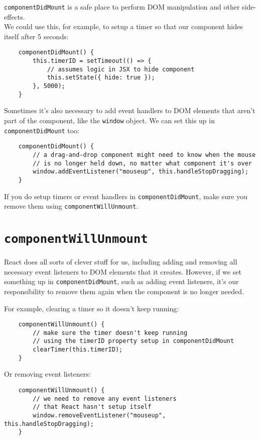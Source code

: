 \texttt{componentDidMount} is a safe place to perform DOM manipulation and other side-effects.
\\

We could use this, for example, to setup a timer so that our component hides itself after 5 seconds:

\begin{verbatim}
    componentDidMount() {
        this.timerID = setTimeout(() => {
            // assumes logic in JSX to hide component
            this.setState({ hide: true });
        }, 5000);
    }
\end{verbatim}

Sometimes it's also necessary to add event handlers to DOM elements that aren't part of the component, like the \texttt{window} object. We can set this up in \texttt{componentDidMount} too:

\begin{verbatim}
    componentDidMount() {
        // a drag-and-drop component might need to know when the mouse
        // is no longer held down, no matter what component it's over
        window.addEventListener("mouseup", this.handleStopDragging);
    }
\end{verbatim}

If you do setup timers or event handlers in \texttt{componentDidMount}, make sure you remove them using \texttt{componentWillUnmount}.


\section{\texttt{componentWillUnmount}}

React does all sorts of clever stuff for us, including adding and removing all necessary event listeners to DOM elements that it creates. However, if we set something up in \texttt{componentDidMount}, such as adding event listeners, it's our responsibility to remove them again when the component is no longer needed.

For example, clearing a timer so it doesn't keep running:

\begin{verbatim}
    componentWillUnmount() {
        // make sure the timer doesn't keep running
        // using the timerID property setup in componentDidMount
        clearTimer(this.timerID);
    }
\end{verbatim}

Or removing event listeners:

\begin{verbatim}
    componentWillUnmount() {
        // we need to remove any event listeners
        // that React hasn't setup itself
        window.removeEventListener("mouseup", this.handleStopDragging);
    }
\end{verbatim}

